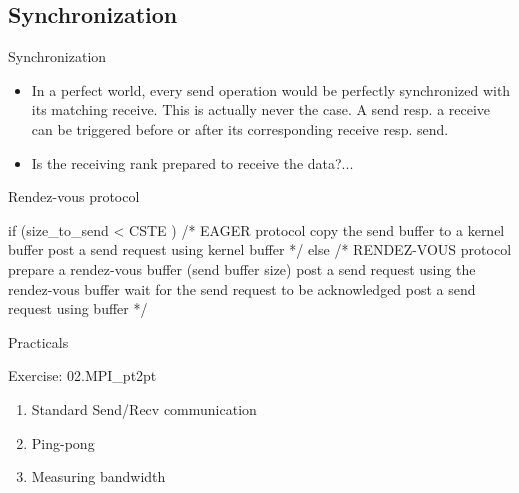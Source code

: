 \documentclass[aspectratio=43]{beamer}
\begin{document}
\subsection{Synchronization}
\begin{frame}[fragile]{Synchronization}
\justifying
\begin{itemize}
\item In a perfect world, every send operation would be perfectly synchronized with its matching receive.
This is actually never the case.
A send resp. a receive can be triggered before or after its corresponding receive resp. send.\\
\item Is the receiving rank prepared to receive the data?...
\end{itemize}
\begin{blue1block}{Rendez-vous protocol}
\vspace{-0.3cm}
\begin{Cpplisting}{}
  if (size_to_send < CSTE ) {
     /*
     EAGER protocol
     copy the send buffer to a kernel buffer
     post a send request using kernel buffer
     */
  } else {
     /*
     RENDEZ-VOUS protocol
     prepare a rendez-vous buffer (send buffer size)
     post a send request using the rendez-vous buffer
     wait for the send request to be acknowledged
     post a send request using buffer
     */
  }
\end{Cpplisting}
\end{blue1block}
\end{frame}

\begin{frame}{Practicals}
    \begin{brown2block}{Exercise: 02.MPI\_pt2pt}
    \begin{enumerate}
    \item  Standard Send/Recv communication
    \item  Ping-pong
    \item  Measuring bandwidth
    \end{enumerate}
    \end{brown2block}
\end{frame}
\end{document}
